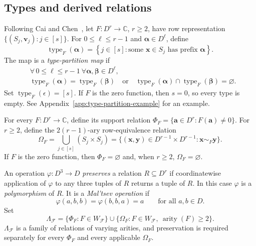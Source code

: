 \documentclass[11pt,letterpaper,onecolumn]{article}
\theoremstyle{plain}
\theoremstyle{definition}
\theoremstyle{remark}
\newcommand{\AlgNums}{\mathbb C}
\newcommand{\cF}{\mathcal F}
\newcommand{\SuppRel}[1]{\Phi_{#1}}
\newcommand{\RowEq}[1]{\Omega_{#1}}
\newcommand{\emptytuple}{\epsilon}
\DeclareMathOperator{\arity}{arity}
\DeclareMathOperator{\typeop}{type}
\begin{document}
\subsection{Types and derived relations}
\label{subsec:types-relations}

Following Cai and Chen~\cite[Sections~2.8--2.9 and~3.1]{CaiChen2017}, let
$F:D^r\to\AlgNums$, $r\ge2$, have row representation
$\{(S_j,\mathbf v_j):j\in[s]\}$.  For $0\le\ell\le r-1$ and
$\boldsymbol\alpha\in D^\ell$, define
\begin{equation*}
  \typeop_F(\boldsymbol\alpha)
  =\left\{j\in[s]:
       \text{some }\mathbf x\in S_j\text{ has prefix }
       \boldsymbol\alpha\right\}.
\end{equation*}
The map is a \emph{type-partition map} if
\begin{equation*}
  \begin{aligned}
  &\forall\,0\le\ell\le r-1\ \forall
    \boldsymbol\alpha,\boldsymbol\beta\in D^\ell,\\
  &\typeop_F(\boldsymbol\alpha)=\typeop_F(\boldsymbol\beta)
    \quad\text{or}\quad
    \typeop_F(\boldsymbol\alpha)
      \cap\typeop_F(\boldsymbol\beta)=\varnothing.
  \end{aligned}
\end{equation*}
Set $\typeop_F(\emptytuple)=[s]$.  If $F$ is the zero function, then $s=0$, so
every type is empty.
See Appendix~\ref{app:type-partition-example} for an example.

For every $F:D^r\to\AlgNums$, define its support relation $\SuppRel F=\{\mathbf a\in D^r:F(\mathbf a)\ne0\}$. For $r\ge2$, define the $2(r-1)$-ary row-equivalence relation
\begin{equation*}
  \RowEq F
  =\bigcup_{j\in[s]}(S_j\times S_j)
  =\{(\mathbf x,\mathbf y)\in D^{r-1}\times D^{r-1}:
      \mathbf x\sim_F\mathbf y\}.
\end{equation*}
If $F$ is the zero function, then $\SuppRel F=\varnothing$ and,
when $r\ge2$, $\RowEq F=\varnothing$.

An operation $\varphi:D^3\to D$ \emph{preserves} a relation $R\subseteq D^r$ if
coordinatewise application of $\varphi$ to any three tuples of $R$ returns a tuple
of $R$.  In this case $\varphi$ is a \emph{polymorphism} of $R$.
It is a \emph{Mal'tsev operation} if
\begin{equation*}
  \varphi(a,b,b)=\varphi(b,b,a)=a
  \qquad\text{for all }a,b\in D.
\end{equation*}
Set
\begin{equation*}
  \Lambda_{\cF}
  =\{\SuppRel F:F\in W_{\cF}\}
    \cup\{\RowEq F:F\in W_{\cF},\ \arity(F)\ge2\}.
\end{equation*}
$\Lambda_{\cF}$ is a family of relations of varying arities, and preservation
is required separately for every $\SuppRel F$ and every applicable
$\RowEq F$.
\end{document}
